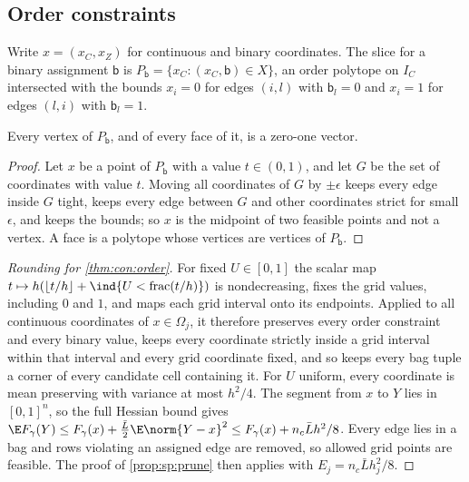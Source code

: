 \subsection{Order constraints}\label{app:con:order}

Write $x=(x_C,x_Z)$ for continuous and binary coordinates. The slice for a
binary assignment $\mathsf b$ is
$P_{\mathsf b}=\{x_C:(x_C,\mathsf b)\in X\}$, an order polytope on $I_C$
intersected with the bounds $x_i=0$ for edges $(i,l)$ with $\mathsf b_l=0$ and
$x_i=1$ for edges $(l,i)$ with $\mathsf b_l=1$.

\begin{lemma}\label{lem:con:order-vertices}
Every vertex of $P_{\mathsf b}$, and of every face of it, is a zero-one vector.
\end{lemma}

\begin{proof}
Let $x$ be a point of $P_{\mathsf b}$ with a value $t\in(0,1)$, and let $G$ be
the set of coordinates with value $t$. Moving all coordinates of $G$ by
$\pm\epsilon$ keeps every edge inside $G$ tight, keeps every edge between
$G$ and other coordinates strict for small $\epsilon$, and keeps the bounds;
so $x$ is the midpoint of two feasible points and not a vertex. A face is a
polytope whose vertices are vertices of $P_{\mathsf b}$.
\end{proof}

\begin{proof}[Rounding for \cref{thm:con:order}]
For fixed $U\in[0,1]$ the scalar map
$t\mapsto h(\lfloor t/h\rfloor+\ind\{U<\operatorname{frac}(t/h)\})$ is
nondecreasing, fixes the grid values, including $0$ and $1$, and maps each
grid interval onto its endpoints. Applied to all continuous coordinates of
$x\in\Omega_j$, it therefore preserves every order constraint and every
binary value, keeps every coordinate strictly inside a grid interval within
that interval and every grid coordinate fixed, and so keeps every bag tuple
a corner of every candidate cell containing it. For $U$ uniform, every
coordinate is mean preserving with variance at most $h^2/4$. The segment from
$x$ to $Y$ lies in $[0,1]^n$, so the full Hessian bound gives
$\E F_\gamma(Y)\le F_\gamma(x)+\frac{\bar L}2\E\norm{Y-x}^2\le F_\gamma(x)+n_c\bar
Lh^2/8$. Every edge lies in a bag and rows violating an assigned edge are
removed, so allowed grid points are feasible. The proof of
\cref{prop:sp:prune} then applies with $E_j=n_c\bar Lh_j^2/8$.
\end{proof}

